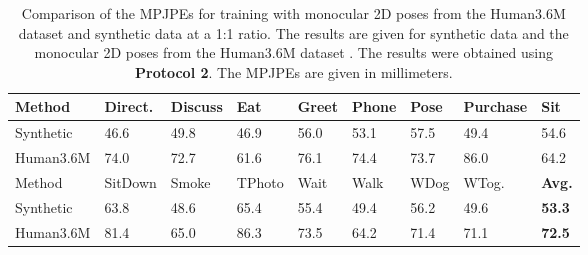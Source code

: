 \begin{table}[]	
	\centering
	\begin{tabularx}{\textwidth}{l *{8}{Y}}
		\toprule
		Method & Direct. & Discuss & Eat & Greet & Phone & Pose & Purchase & Sit \\
		\midrule
		Synthetic & 46.6 & 49.8 & 46.9 & 56.0 & 53.1 & 57.5 & 49.4 & 54.6 \\
		Human3.6M & 74.0 & 72.7 & 61.6 & 76.1 & 74.4 & 73.7 & 86.0 & 64.2 \\
		\bottomrule
		\toprule
		Method & SitDown & Smoke & TPhoto & Wait & Walk & WDog & WTog. & \textbf{Avg.}\\
		\midrule
		Synthetic & 63.8 & 48.6 & 65.4 & 55.4 & 49.4 & 56.2 & 49.6 & \textbf{53.3} \\
		Human3.6M & 81.4 & 65.0 & 86.3 & 73.5 & 64.2 & 71.4 & 71.1 & \textbf{72.5} \\
		\bottomrule
	\end{tabularx}
	\caption{
		Comparison of the MPJPEs for training with monocular 2D poses from the Human3.6M dataset and synthetic data at a 1:1 ratio.
		The results are given for synthetic data and the monocular 2D poses from the Human3.6M dataset \cite{ionescu14}.
		The results were obtained using \textbf{Protocol 2}. The MPJPEs are given in millimeters.
	 }
	\label{tbl:results-real-and-synthetic-protocol2}
\end{table}